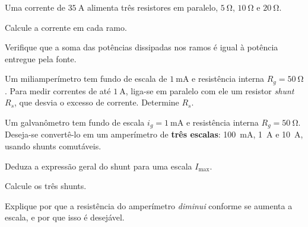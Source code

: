 \blocoaprofundamento
\begin{questao}[3]{}

Uma corrente de $\SI{35}{\ampere}$ alimenta três resistores em paralelo,
$\SI{5}{\ohm}$, $\SI{10}{\ohm}$ e $\SI{20}{\ohm}$.
\begin{itensq}
\item Calcule a corrente em cada ramo.
\item Verifique que a soma das potências dissipadas nos ramos é igual à potência
      entregue pela fonte.
\end{itensq}


\end{questao}
\begin{questao}[3]{}

Um miliamperímetro tem fundo de escala de $\SI{1}{\milli\ampere}$ e resistência
interna $R_g = \SI{50}{\ohm}$. Para medir correntes de até $\SI{1}{\ampere}$,
liga-se em paralelo com ele um resistor \emph{shunt} $R_s$, que desvia o excesso
de corrente. Determine $R_s$.




\end{questao}
\begin{questao}[3]{}

Um galvanômetro tem fundo de escala $i_g = \SI{1}{\milli\ampere}$ e resistência
interna $R_g = \SI{50}{\ohm}$. Deseja-se convertê-lo em um amperímetro de
\textbf{três escalas}: \SI{100}{\milli\ampere}, \SI{1}{\ampere} e
\SI{10}{\ampere}, usando shunts comutáveis.
\begin{itensq}
\item Deduza a expressão geral do shunt para uma escala $I_{\max}$.
\item Calcule os três shunts.
\item Explique por que a resistência do amperímetro \emph{diminui} conforme se
      aumenta a escala, e por que isso é desejável.
\end{itensq}


\end{questao}

